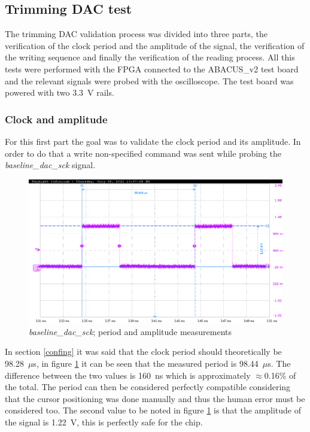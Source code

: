 \subsection{Trimming DAC test}\label{dactests}
The trimming DAC validation process was divided into three parts, the verification of the clock period and the amplitude of the signal, the verification of the writing sequence and finally the verification of the reading process. 
All this tests were performed with the FPGA connected to the ABACUS\_v2 test board and the relevant signals were probed with the oscilloscope. The test board was powered with two 3.3~V rails.
\subsubsection{Clock and amplitude}
For this first part the goal was to validate the clock period and its amplitude. In order to do that a write non-specified command was sent while probing the \textit{baseline\_dac\_sck} signal. 
\begin{figure}[H]
	\centering
	\includegraphics[width=0.7\linewidth]{IMG/ch5/probe/09-08-2021_clock-specks}
	\caption{\textit{baseline\_dac\_sck}; period and amplitude measurements}
	\label{fig:clockspecs}
\end{figure}
\noindent In section \ref{confing} it was said that the clock period should theoretically be 98.28~$\mu$s, in figure \ref{fig:clockspecs} it can be seen that the measured period is 98.44~$\mu$s. The difference between the two values is 160~ns which is approximately $\approx$0.16\% of the total. The period can then be considered perfectly compatible considering that the cursor positioning was done manually and thus the human error must be considered too.
The second value to be noted in figure \ref{fig:clockspecs} is that the amplitude of the signal is 1.22~V, this is perfectly safe for the chip. 

